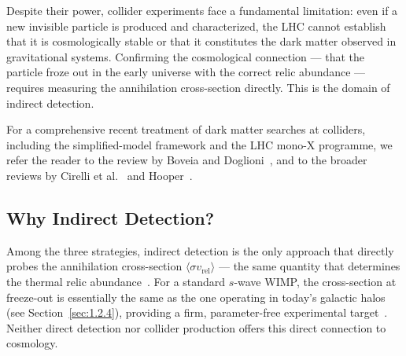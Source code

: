 Despite their power, collider experiments face a fundamental limitation: even if a new invisible particle is produced and characterized, the LHC cannot establish that it is cosmologically stable or that it constitutes the dark matter observed in gravitational systems.
Confirming the cosmological connection --- that the particle froze out in the early universe with the correct relic abundance --- requires measuring the annihilation cross-section directly.
This is the domain of indirect detection.

For a comprehensive recent treatment of dark matter searches at colliders, including the simplified-model framework and the LHC mono-X programme, we refer the reader to the review by Boveia and Doglioni~\cite{Boveia:2018yeb}, and to the broader reviews by Cirelli et al.~\cite{Cirelli:2024ssz} and Hooper~\cite{Hooper:2024}.

\subsection{Why Indirect Detection?}
\label{sec:1.3.3}

Among the three strategies, indirect detection is the only approach that directly probes the annihilation cross-section $\langle \sigma v_\text{rel} \rangle$ --- the same quantity that determines the thermal relic abundance~\cite{Hooper:2024}.
For a standard $s$-wave WIMP, the cross-section at freeze-out is essentially the same as the one operating in today's galactic halos (see Section~\ref{sec:1.2.4}), providing a firm, parameter-free experimental target~\cite{Steigman:2012nb,Hooper:2024}.
Neither direct detection nor collider production offers this direct connection to cosmology.

